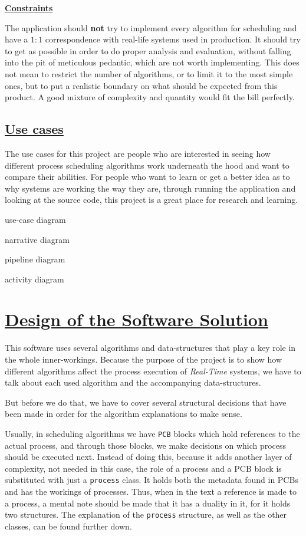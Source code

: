 \documentclass{article}
\newcommand{\code}[1]{\colorbox{codebg}{{\color{black}\texttt{#1}}}}
\begin{document}
\underline{\textbf{Constraints}}

The application should \textbf{not} try to implement every algorithm for scheduling and have a \(1:1\) correspondence with real-life systems used in production. It should try to get as possible in order to do proper analysis and evaluation, without falling into the pit of meticulous pedantic, which are not worth implementing. This does not mean to restrict the number of algorithms, or to limit it to the most simple ones, but to put a realistic boundary on what should be expected from this product. A good mixture of complexity and quantity would fit the bill perfectly.

\subsection{\underline{Use cases}}

The use cases for this project are people who are interested in seeing how different process scheduling algorithms work underneath the hood and want to compare their abilities. For people who want to learn or get a better idea as to why systems are working the way they are, through running the application and looking at the source code, this project is a great place for research and learning.

use-case diagram

narrative diagram

pipeline diagram

activity diagram

\section{\underline{Design of the Software Solution}}

This software uses several algorithms and data-structures that play a key role in the whole inner-workings. Because the purpose of the project is to show how different algorithms affect the process execution of \textit{Real-Time} systems, we have to talk about each used algorithm and the accompanying data-structures.

But before we do that, we have to cover several structural decisions that have been made in order for the algorithm explanations to make sense.

Usually, in scheduling algorithms we have \code{PCB} blocks which hold references to the actual process, and through those blocks, we make decisions on which process should be executed next. Instead of doing this, because it adds another layer of complexity, not needed in this case, the role of a process and a PCB block is substituted with just a \code{process} class. It holds both the metadata found in PCBs and has the workings of processes. Thus, when in the text a reference is made to a process, a mental note should be made that it has a duality in it, for it holds two structures. The explanation of the \code{process} structure, as well as the other classes, can be found further down.
\end{document}
